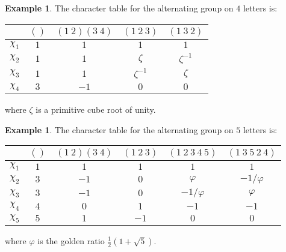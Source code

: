 \documentclass[12pt]{article}
\theoremstyle{plain}
\theoremstyle{definition}
\newtheorem{example}[theorem]{Example}
\theoremstyle{remark}
\numberwithin{equation}{section}
\begin{document}
\begin{example}
The character table for the alternating group on $4$ letters
is:
\begin{center}
\begin{tabular}{|c|c|c|c|c|}
\hline 
 & $()$ & $(1\ 2)(3\ 4)$ & $(1\ 2\ 3)$ & $(1\ 3\ 2)$\\
\hline 
\hline 
$\chi_1$ & $1$ & $1$ & $1$ & $1$\\
\hline 
$\chi_2$ & $1$ & $1$ & $\zeta$ & $\zeta^{-1}$\\
\hline 
$\chi_3$ & $1$ & $1$ & $\zeta^{-1}$ & $\zeta$\\
\hline 
$\chi_4$ & $3$ & $-1$ & $0$ & $0$\\
\hline
\end{tabular}
\end{center}
where $\zeta$ is a primitive cube root of unity.
\end{example}

\begin{example}
The character table for the alternating group on $5$ letters
is:
\begin{center}
\begin{tabular}{|c|c|c|c|c|c|}
\hline 
 & $()$ & $(1\ 2)(3\ 4)$ & $(1\ 2\ 3)$ & $(1\ 2\ 3\ 4\ 5)$ & $(1\ 3\ 5\ 2\ 4)$\\
\hline 
\hline 
$\chi_1$ & $1$ & $1$ & $1$ & $1$ & $1$\\
\hline 
$\chi_2$ & $3$ & $-1$ & $0$ & $\varphi$ & $-1/\varphi$\\
\hline 
$\chi_3$ & $3$ & $-1$ & $0$ & $-1/\varphi$ & $\varphi$\\
\hline 
$\chi_4$ & $4$ & $0$ & $1$ & $-1$ & $-1$\\
\hline 
$\chi_5$ & $5$ & $1$ & $-1$ & $0$ & $0$\\
\hline
\end{tabular}
\end{center}
where $\varphi$ is the golden ratio $\frac{1}{2}(1+\sqrt{5})$.
\end{example}




\end{document}
